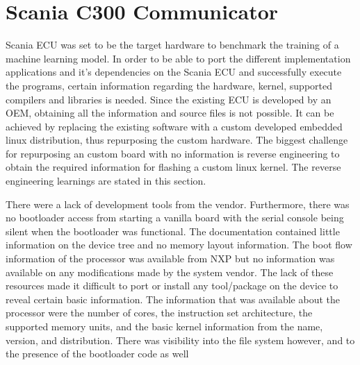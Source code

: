 \chapter{Scania C300 Communicator} \label{rtc-c300}

Scania ECU was set to be the target hardware to benchmark the training of a machine learning model. In order to be able to port the different implementation applications and it's dependencies on the Scania ECU and successfully execute the programs, certain information regarding the hardware, kernel, supported compilers and libraries is needed. Since the existing ECU is developed by an OEM, obtaining all the information and source files is not possible. It can be achieved by replacing the existing software with a custom developed embedded linux distribution, thus repurposing the custom hardware. The biggest challenge for repurposing an custom board with no information is reverse engineering to obtain the required information for flashing a custom linux kernel. The reverse engineering learnings are stated in this section.

There were a lack of development tools from the vendor. Furthermore, there was no bootloader access from starting a vanilla board with the serial console being silent when the bootloader was functional. The documentation contained little information on the device tree and no memory layout information. The boot flow information of the processor was available from NXP but no information was available on any modifications made by the system vendor. The lack of these resources made it difficult to port or install any tool/package on the device to reveal certain basic information. The information that was available about the processor were the number of cores, the instruction set architecture, the supported memory units, and the basic kernel information from the name, version, and distribution. There was visibility into the file system however, and to the presence of the bootloader code as well



